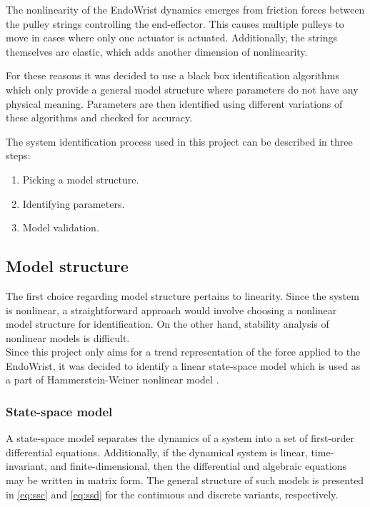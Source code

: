 The nonlinearity of the EndoWrist dynamics emerges from friction forces between the pulley strings controlling the end-effector. This causes multiple pulleys to move in cases where only one actuator is actuated.
Additionally, the strings themselves are elastic, which adds another dimension of nonlinearity.

For these reasons it was decided to use a black box identification algorithms which only provide a general model structure where parameters do not have any physical meaning. 
Parameters are then identified using different variations of these algorithms and checked for accuracy.

The system identification process used in this project can be described in three steps:
\begin{enumerate}
\item Picking a model structure.
\item Identifying parameters.
\item Model validation.
\end{enumerate}

\subsection{Model structure}\label{se:ms}
The first choice regarding model structure pertains to linearity.
Since the system is nonlinear, a straightforward approach would involve choosing a nonlinear model structure for identification.
On the other hand, stability analysis of nonlinear models is difficult.\\
Since this project only aims for a trend representation of the force applied to the EndoWrist, it was decided to identify a linear state-space model which is used as a part of Hammerstein-Weiner nonlinear model \cite{zhu2002estimation}.

\subsubsection{State-space model}
A state-space model separates the dynamics of a system into a set of first-order differential equations.
Additionally, if the dynamical system is linear, time-invariant, and finite-dimensional, then the differential and algebraic equations may be written in matrix form. The general structure of such models is presented in \eqref{eq:ssc} and \eqref{eq:ssd} for the continuous and discrete variants, respectively.


